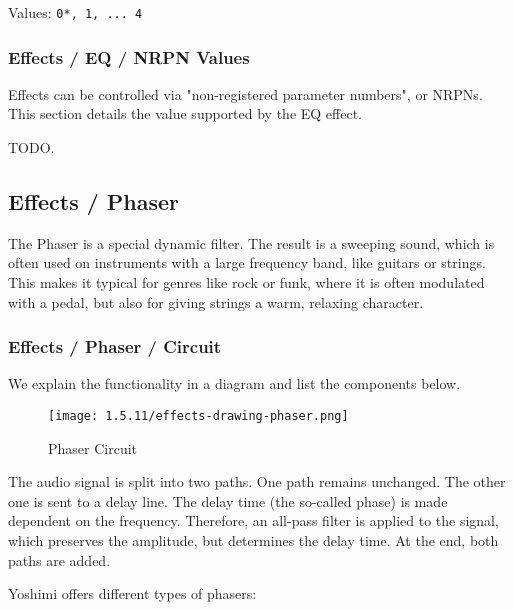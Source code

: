    Values: \texttt{0*, 1, ... 4}

\subsubsection{Effects / EQ / NRPN Values}
\label{subsubsec:effects_edit_eq_nrpn}

   Effects can be controlled via "non-registered parameter numbers", or NRPNs.
   This section details the value supported by the EQ effect.

   TODO.

\subsection{Effects / Phaser}
\label{subsec:effects_edit_phaser}

   The Phaser is a special dynamic filter. The result is a sweeping sound,
   which is often used on instruments with a large frequency band, like
   guitars or strings. This makes it typical for genres like rock or funk,
   where it is often modulated with a pedal, but also for giving strings a
   warm, relaxing character.

\subsubsection{Effects / Phaser / Circuit}
\label{subsubsec:effects_edit_phaser_circuit}

   We explain the functionality in a diagram and list the components below.

\begin{figure}[H]
   \centering
   \texttt{[image: 1.5.11/effects-drawing-phaser.png]}
   \caption{Phaser Circuit}
   \label{fig:phaser_circuit}
\end{figure}

   The audio signal is split into two paths. One path remains unchanged. The
   other one is sent to a delay line. The delay time (the so-called phase) is
   made dependent on the frequency. Therefore, an all-pass filter is applied
   to the signal, which preserves the amplitude, but determines the delay
   time. At the end, both paths are added.

   Yoshimi offers different types of phasers:

